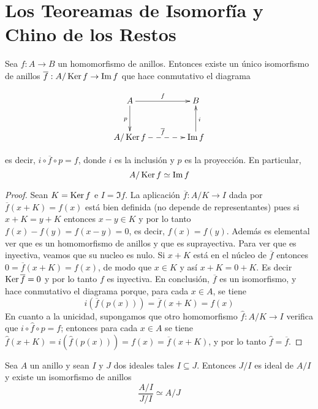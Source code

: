 \section{ Los Teoreamas de Isomorfía y Chino de los Restos}

\begin{teo}
    Sea $f:A\rightarrow B$ un homomorfismo de anillos. Entonces existe un único isomorfismo de anillos $\overline{f}: A/\operatorname{\rm Ker} f\rightarrow \operatorname{\rm Im} f$ que hace conmutativo el diagrama

    $$\xymatrix@C=1.5cm@R=1cm{ 
        A \ar[r]^f\ar[d]_p                     & B \\ 
        A/\Ker f \ar@{-->}[r]^{\overline{f}}  & \Im f\ar[u]_i 
    }$$
    
    es decir, $i\circ \overline{f} \circ p=f$, donde $i$ es la inclusión y $p$ es la proyección. En particular,
    $$ A/\operatorname{\rm Ker} f\simeq \operatorname{\rm Im} f$$
\end{teo}

\begin{proof}
    Sean $K=\operatorname{\rm Ker} f$ e $I=\Im f$. La aplicación $\overline{f}: A/K\rightarrow I$ dada por $\overline{f}(x+K)=f(x)$ está bien definida (no depende de representantes) pues si $x+K=y+K$ entonces $x-y\in K$ y por lo tanto $f(x)-f(y)=f(x-y)=0$, es decir, $f(x)=f(y)$. Además es elemental ver que es un homomorfismo de anillos y que es suprayectiva. Para ver que es inyectiva, veamos que su nucleo es nulo. Si $x+K$ está en el núcleo de $\overline{f}$ entonces $0=\overline{f}(x+K)=f(x)$, de modo que $x\in K$ y así $x+K=0+K$. Es decir $\operatorname{\rm Ker}\overline{f}=0$ y por lo tanto $f$ es inyectiva. En conclusión, $\overline{f}$ es un isomorfismo, y hace conmutativo el diagrama porque, para cada $x\in A$, se tiene
    $$i\left(\overline{f}\left(p(x)\right)\right)=\overline{f}(x+K)=f(x)$$
    En cuanto a la unicidad, supongamos que otro homomorfismo $\widehat{f}:A/K\longrightarrow I$ verifica que $i\circ \widehat{f} \circ p=f$; entonces para cada $x\in A$ se tiene $\widehat{f}(x+K)=i(\widehat{f}(p(x)))=f(x)=\overline{f}(x+K)$, y por lo tanto $\widehat{f}=\overline{f}$.
\end{proof}

\begin{teo} Sea $A$ un anillo y sean $I$ y $J$ dos ideales tales $I\subseteq J$.
    Entonces $J/I$ es ideal de $A/I$ y existe un isomorfismo de anillos
    $$\frac{A/I}{J/I}\simeq A/J$$
\end{teo}

